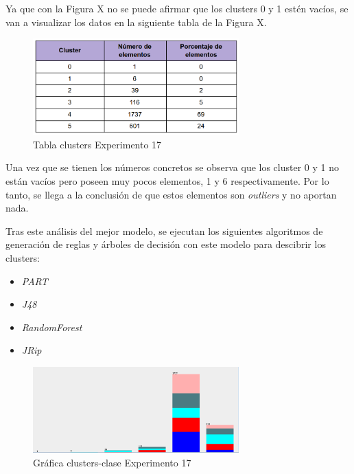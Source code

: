 \documentclass[12pt,a4paper, xcolor=table]{article}
\begin{document}
Ya que con la Figura X no se puede afirmar que los clusters 0 y 1 estén vacíos, se van a visualizar los datos en la siguiente tabla de la Figura X.

\begin{figure}[h]
    \centering
    \includegraphics[width=300px]{img/clusters_mejor_exp.png}
    \caption{Tabla clusters Experimento 17}
    \label{fig:graf_exp1}
\end{figure}

\newpage

Una vez que se tienen los números concretos se observa que los cluster 0 y 1 no están vacíos pero poseen muy pocos elementos, 1 y 6 respectivamente. Por lo tanto, se llega a la conclusión de que estos elementos son \textit{outliers} y no aportan nada.

\vspace{4mm}

Tras este análisis del mejor modelo, se ejecutan los siguientes algoritmos de generación de reglas y árboles de decisión con este modelo para descibrir los clusters:

\begin{itemize}
    \item \textit{PART}
    \item \textit{J48}
    \item \textit{RandomForest}
    \item \textit{JRip}
\end{itemize}


\begin{figure}[h]
    \centering
    \includegraphics[width=300px]{img/clusters_class.png}
    \caption{Gráfica clusters-clase Experimento 17}
    \label{fig:graf_exp1}
\end{figure}
\end{document}
